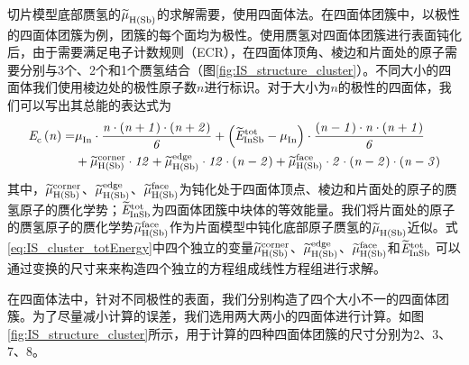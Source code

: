 切片模型底部赝氢的$\it \widetilde{\mu}_{\rm H\left(Sb\right)}^{\rm } \it$的求解需要，使用四面体法。在四面体团簇中，以极性的四面体团簇为例，团簇的每个面均为极性。使用赝氢对四面体团簇进行表面钝化后，由于需要满足电子计数规则（ECR），在四面体顶角、棱边和片面处的原子需要分别与3个、2个和1个赝氢结合（图\ref{fig:IS_structure_cluster}）。不同大小的四面体我们使用棱边处的极性原子数$n$进行标识。对于大小为$n$的极性的四面体，我们可以写出其总能的表达式为\chinesecolon
\begin{equation}
    \label{eq:IS_cluster_totEnergy}
    \begin{split}
        \it E_{\rm c}^{\rm } \it\left(n\right)=&\it \mu_{\rm In}^{\rm } \it \cdot \frac{n\cdot \left(n+1\right) \cdot \left(n+2\right)}{6} +\left(\it \widetilde{E}_{\rm InSb}^{\rm tot} \it-\it \mu_{\rm In}^{\rm } \it\right)\cdot \frac{\left(n-1\right)\cdot n \cdot \left(n+1\right)}{6}\\
        &+\it \widetilde{\mu}_{\rm H\left(Sb\right)}^{\rm corner} \it\cdot 12 + \it \widetilde{\mu}_{\rm H\left(Sb\right)}^{\rm edge} \it\cdot 12 \cdot \left(n-2\right) + \it \widetilde{\mu}_{\rm H\left(Sb\right)}^{\rm face} \it\cdot 2 \cdot (n-2) \cdot (n-3)
    \end{split}
\end{equation}
其中，$\it \widetilde{\mu}_{\rm H\left(Sb\right)}^{\rm corner} \it$、$\it \widetilde{\mu}_{\rm H\left(Sb\right)}^{\rm edge} \it$、$\it \widetilde{\mu}_{\rm H\left(Sb\right)}^{\rm face} \it$为钝化处于四面体顶点、棱边和片面处的原子的赝氢原子的赝化学势；$\it \widetilde{E}_{\rm InSb}^{\rm tot} \it$为四面体团簇中块体的等效能量。我们将片面处的原子的赝氢原子的赝化学势$\it \widetilde{\mu}_{\rm H\left(Sb\right)}^{\rm face} \it$作为片面模型中钝化底部原子赝氢的$\it \widetilde{\mu}_{\rm H\left(Sb\right)}^{\rm } \it$近似。式\ref{eq:IS_cluster_totEnergy}中四个独立的变量$\it \widetilde{\mu}_{\rm H\left(Sb\right)}^{\rm corner} \it$、$\it \widetilde{\mu}_{\rm H\left(Sb\right)}^{\rm edge} \it$、$\it \widetilde{\mu}_{\rm H\left(Sb\right)}^{\rm face} \it$和$\it \widetilde{E}_{\rm InSb}^{\rm tot} \it$
可以通过变换的尺寸来来构造四个独立的方程组成线性方程组进行求解。

在四面体法中，针对不同极性的表面，我们分别构造了四个大小不一的四面体团簇。为了尽量减小计算的误差，我们选用两大两小的四面体进行计算。如图\ref{fig:IS_structure_cluster}所示，用于计算的四种四面体团簇的尺寸分别为2、3、7、8。

